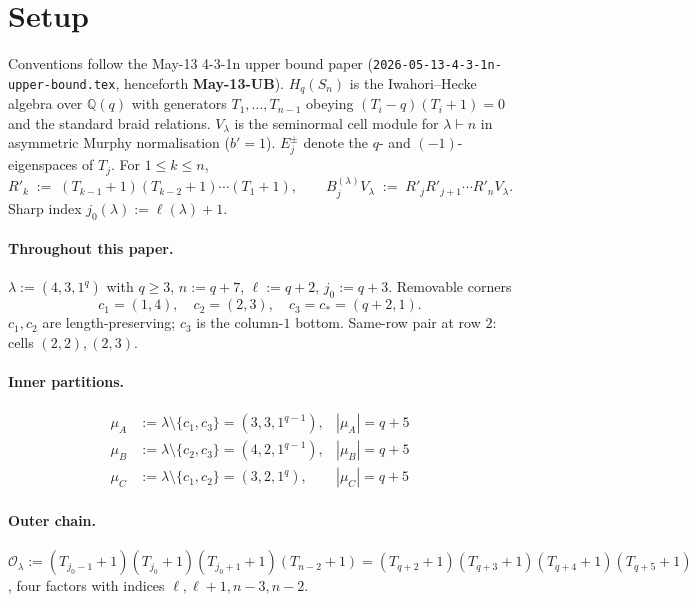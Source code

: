 \documentclass[11pt]{article}
\theoremstyle{definition}
\begin{document}
\begin{abstract}
\textbf{Status.} Partial. The A--B separation and the obstruction
analysis are fully structural. The within-$X$ linear independence
reduces to a tracer-pair Hoefsmit computation that we leave for a
follow-up paper.
\end{abstract}

\section{Setup}\label{sec:setup}

Conventions follow the May-13 4-3-1n upper bound paper
(\texttt{2026-05-13-4-3-1n-upper-bound.tex}, henceforth
\textbf{May-13-UB}). $H_q(S_n)$ is the Iwahori--Hecke algebra over
$\mathbb{Q}(q)$ with generators $T_1, \ldots, T_{n-1}$ obeying
$(T_i - q)(T_i + 1) = 0$ and the standard braid relations.
$V_\lambda$ is the seminormal cell module for $\lambda \vdash n$ in
asymmetric Murphy normalisation ($b' = 1$). $E_j^\pm$ denote the
$q$- and $(-1)$-eigenspaces of $T_j$. For $1 \le k \le n$,
\[
   R'_k \;:=\; (T_{k-1}{+}1)(T_{k-2}{+}1)\cdots(T_1{+}1),
   \qquad
   B^{(\lambda)}_j V_\lambda \;:=\; R'_j R'_{j+1}\cdots R'_n V_\lambda.
\]
Sharp index $j_0(\lambda) := \ell(\lambda) + 1$.

\paragraph{Throughout this paper.}
$\lambda := (4, 3, 1^q)$ with $q \ge 3$, $n := q + 7$, $\ell := q + 2$,
$j_0 := q + 3$. Removable corners
\[
   c_1 = (1, 4), \quad c_2 = (2, 3), \quad c_3 = c_* = (q+2, 1).
\]
$c_1, c_2$ are length-preserving; $c_3$ is the column-$1$ bottom.
Same-row pair at row $2$: cells $(2, 2), (2, 3)$.

\paragraph{Inner partitions.}
\begin{align*}
   \mu_A &:= \lambda \setminus \{c_1, c_3\} = (3, 3, 1^{q-1}),
      &|\mu_A| = q+5 \\
   \mu_B &:= \lambda \setminus \{c_2, c_3\} = (4, 2, 1^{q-1}),
      &|\mu_B| = q+5 \\
   \mu_C &:= \lambda \setminus \{c_1, c_2\} = (3, 2, 1^q),
      &|\mu_C| = q+5
\end{align*}

\paragraph{Outer chain.}
$\mathcal{O}_\lambda := (T_{j_0-1}{+}1)(T_{j_0}{+}1)(T_{j_0+1}{+}1)(T_{n-2}{+}1)
= (T_{q+2}{+}1)(T_{q+3}{+}1)(T_{q+4}{+}1)(T_{q+5}{+}1)$,
four factors with indices $\ell, \ell+1, n-3, n-2$.
\end{document}
